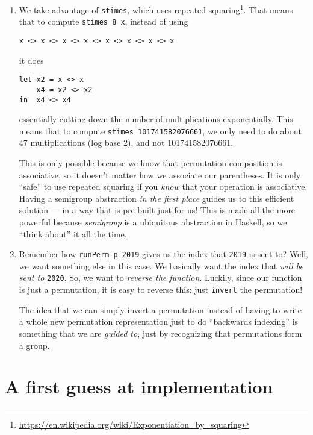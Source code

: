 \documentclass[]{article}
\renewcommand{\href}[2]{#2\footnote{\url{#1}}}
\begin{document}
\begin{enumerate}
\def\labelenumi{\arabic{enumi}.}
\item
  We take advantage of \texttt{stimes}, which uses
  \href{https://en.wikipedia.org/wiki/Exponentiation_by_squaring}{repeated
  squaring}. That means that to compute \texttt{stimes\ 8\ x}, instead of using

\begin{verbatim}
x <> x <> x <> x <> x <> x <> x <> x
\end{verbatim}

  it does

\begin{verbatim}
let x2 = x <> x
    x4 = x2 <> x2
in  x4 <> x4
\end{verbatim}

  essentially cutting down the number of multiplications exponentially. This
  means that to compute \texttt{stimes\ 101741582076661}, we only need to do
  about 47 multiplications (log base 2), and not 101741582076661.

  This is only possible because we know that permutation composition is
  associative, so it doesn't matter how we associate our parentheses. It is only
  ``safe'' to use repeated squaring if you \emph{know} that your operation is
  associative. Having a semigroup abstraction \emph{in the first place} guides
  us to this efficient solution --- in a way that is pre-built just for us! This
  is made all the more powerful because \emph{semigroup} is a ubiquitous
  abstraction in Haskell, so we ``think about'' it all the time.
\item
  Remember how \texttt{runPerm\ p\ 2019} gives us the index that \texttt{2019}
  is sent to? Well, we want something else in this case. We basically want the
  index that \emph{will be sent to} \texttt{2020}. So, we want to \emph{reverse
  the function}. Luckily, since our function is just a permutation, it is easy
  to reverse this: just \texttt{invert} the permutation!

  The idea that we can simply invert a permutation instead of having to write a
  whole new permutation representation just to do ``backwards indexing'' is
  something that we are \emph{guided to}, just by recognizing that permutations
  form a group.
\end{enumerate}

\section{A first guess at implementation}\label{a-first-guess-at-implementation}
\end{document}
